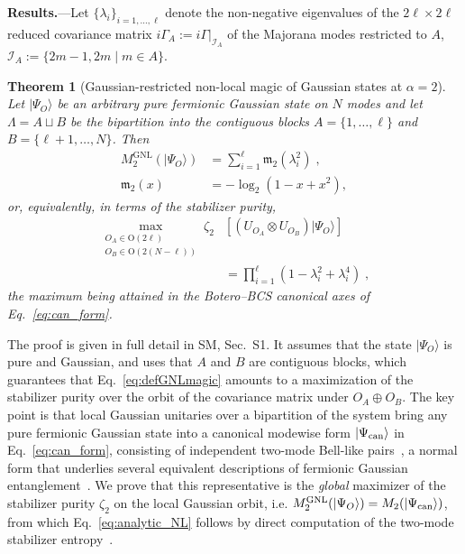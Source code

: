 \documentclass[aps,prl,twocolumn,superscriptaddress,reprint,longbibliography,nofootinbib]{revtex4-2}
\newtheorem{theorem}{Theorem}
\newcommand{\RENYI}{\alpha}
\begin{document}
\textbf{Results.}---Let $\{\lambda_i\}_{i=1,\dots,\ell}$ denote the non-negative eigenvalues of the $2\ell\times 2\ell$ reduced covariance matrix $i\Gamma_A := i\Gamma|_{\mathcal{I}_A}$ of the Majorana modes restricted to $A$, $\mathcal{I}_A:=\{2m-1,2m\;|\; m\in A\}$.

\begin{theorem}[Gaussian-restricted non-local magic of Gaussian states at $\RENYI=2$]
\label{thm:global}
Let $|\Psi_O\rangle$ be an arbitrary pure fermionic Gaussian state on $N$ modes and let $\Lambda=A\sqcup B$ be the bipartition into the contiguous blocks $A=\{1,\dots,\ell\}$ and $B=\{\ell+1,\dots,N\}$. Then
\begin{equation}
\begin{split}
    M_{2}^{\mathrm{GNL}}(|\Psi_O\rangle)&=\sum_{i=1}^{\ell}\mathfrak{m}_2(\lambda_i^2)\;,\\
    \mathfrak{m}_2(x)&=-\log_2\!\left(1-x+x^2\right),
\end{split}
    \label{eq:analytic_NL}
\end{equation}
or, equivalently, in terms of the stabilizer purity,
\begin{equation}
\begin{split}
\max_{\substack{O_A\in \mathrm{O}(2\ell)\\ O_B\in \mathrm{O}(2(N-\ell))}}\!\!\!\!\zeta_2&\left[(U_{O_A}\otimes U_{O_B})|\Psi_O\rangle\right]\\ &=\prod_{i=1}^{\ell}\left(1-\lambda_i^2+\lambda_i^4\right)\;,
\end{split}
\label{eq:thm_zeta}
\end{equation}
the maximum being attained in the Botero--BCS canonical axes of Eq.~\eqref{eq:can_form}.
\end{theorem}

The proof is given in full detail in SM, Sec.~S1. It assumes that the state $|\Psi_O\rangle$ is pure and Gaussian, and uses that $A$ and $B$ are contiguous blocks, which guarantees that Eq.~\eqref{eq:defGNLmagic} amounts to a maximization of the stabilizer purity over the orbit of the covariance matrix under $O_A\oplus O_B$.
The key point is that local Gaussian unitaries over a bipartition of the system bring any pure fermionic Gaussian state into a canonical modewise form $\ket{\Psi_{\rm can}}$ in Eq.~\eqref{eq:can_form}, consisting of independent two-mode Bell-like pairs~\cite{BoteroReznik2004}, a normal form that underlies several equivalent descriptions of fermionic Gaussian entanglement~\cite{SpeeSchwaigerGiedkeKraus2018,MorralYepesLangerGammonSmithKrausPollmann2025,langer2026matchgatecircuitrepresentationfermionic}.
We prove that this representative is the \emph{global} maximizer of the stabilizer purity $\zeta_2$ on the local Gaussian orbit, i.e.
$M_{2}^{\mathrm{GNL}}(|\Psi_O\rangle) = M_{2}(|\Psi_{\rm can}\rangle)$,
from which Eq.~\eqref{eq:analytic_NL} follows by direct computation of the two-mode stabilizer entropy~\cite{Cao_2025,qian2025quantumnonlocalnonstabilizerness}.
\end{document}
